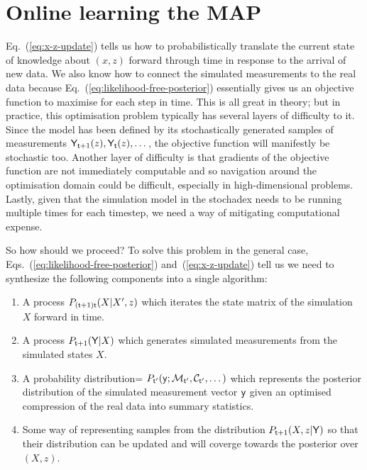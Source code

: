 \section{\sffamily Online learning the MAP}

Eq.~(\ref{eq:x-z-update}) tells us how to probabilistically translate the current state of knowledge about $(x,z)$ forward through time in response to the arrival of new data. We also know how to connect the simulated measurements to the real data because Eq.~(\ref{eq:likelihood-free-posterior}) essentially gives us an objective function to maximise for each step in time. This is all great in theory; but in practice, this optimisation problem typically has several layers of difficulty to it. Since the model has been defined by its stochastically generated samples of measurements ${\sf Y}_{{\sf t}+1}(z), {\sf Y}_{{\sf t}}(z), \dots$, the objective function will manifestly be stochastic too. Another layer of difficulty is that gradients of the objective function are not immediately computable and so navigation around the optimisation domain could be difficult, especially in high-dimensional problems. Lastly, given that the simulation model in the stochadex needs to be running multiple times for each timestep, we need a way of mitigating computational expense. 

So how should we proceed? To solve this problem in the general case, Eqs.~(\ref{eq:likelihood-free-posterior}) and~(\ref{eq:x-z-update}) tell us we need to synthesize the following components into a single algorithm:
\begin{enumerate}
\item{A process $P_{({\sf t}+1){\sf t}}(X\vert X', z)$ which iterates the state matrix of the simulation $X$ forward in time.}
\item{A process $P_{{\sf t}+1}({\sf Y}\vert X)$ which generates simulated measurements from the simulated states $X$.}
\item{A probability distribution= $P_{{\sf t}'}({\sf y};{\cal M}_{{\sf t}'},{\cal C}_{{\sf t}'}, \dots )$ which represents the posterior distribution of the simulated measurement vector ${\sf y}$ given an optimised compression of the real data into summary statistics.}
\item{Some way of representing samples from the distribution $P_{{\sf t}+1}(X,z\vert {\sf Y})$ so that their distribution can be updated and will coverge towards the posterior over $(X,z)$.}
\end{enumerate}

